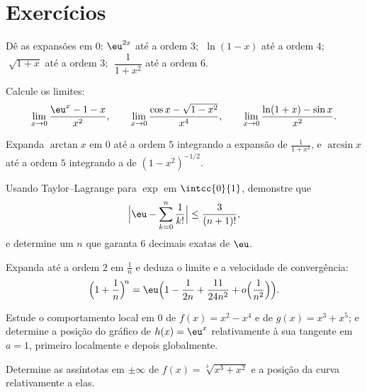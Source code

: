 \section{Exercícios}

\begin{exercise}[$\star$]\label{exo:b1:taylor:1}
Dê as expansões em $0$: $\eu^{2x}$ até a ordem $3$;
$\;\ln(1 - x)$ até a ordem $4$; $\;\sqrt{1 + x}$ até a ordem $3$;
$\;\dfrac{1}{1 + x^2}$ até a ordem $6$.
\end{exercise}

\begin{exercise}[$\star$]\label{exo:b1:taylor:2}
Calcule os limites:
\[
\lim_{x\to 0} \frac{\eu^x - 1 - x}{x^2},
\qquad
\lim_{x\to 0} \frac{\cos x - \sqrt{1 - x^2}}{x^4},
\qquad
\lim_{x\to 0} \frac{\ln(1+x) - \sin x}{x^2}.
\]
\end{exercise}

\begin{exercise}[$\star$]\label{exo:b1:taylor:3}
Expanda $\arctan x$ em $0$ até a ordem $5$ integrando a expansão de $\frac{1}{1 + x^2}$, e
$\arcsin x$ até a ordem $5$ integrando a de $(1 - x^2)^{-1/2}$.
\end{exercise}

\begin{exercise}[$\star$]\label{exo:b1:taylor:4}
Usando Taylor--Lagrange para $\exp$ em $\intcc{0}{1}$, demonstre que
\[
\Bigl| \eu - \sum_{k=0}^{n} \frac{1}{k!} \Bigr| \leq
\frac{3}{(n+1)!},
\]
e determine um $n$ que garanta $6$ decimais exatas de $\eu$.
\end{exercise}

\begin{exercise}[$\star\star$]\label{exo:b1:taylor:5}
Expanda até a ordem $2$ em $\frac1n$ e deduza o limite e a
velocidade de convergência:
\[
\Bigl(1 + \frac 1n\Bigr)^{\!n}
= \eu\Bigl(1 - \frac{1}{2n} + \frac{11}{24n^2} +
o\Bigl(\frac{1}{n^2}\Bigr)\Bigr).
\]
\end{exercise}

\begin{exercise}[$\star\star$]\label{exo:b1:taylor:6}
Estude o comportamento local em $0$ de $f(x) = x^2 - x^4$ e de $g(x) =
x^3 + x^5$; e determine a
posição do gráfico de $h(x) = \eu^x$ relativamente à sua tangente em $a = 1$,
primeiro localmente e depois globalmente.
\end{exercise}

\begin{exercise}[$\star\star$]\label{exo:b1:taylor:7}
Determine as assíntotas em $\pm\infty$ de $f(x) =
\sqrt[3]{x^3 + x^2}$ e a posição da curva
relativamente a elas.
\end{exercise}

